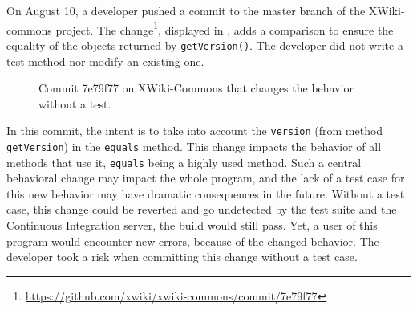 On August 10, a developer pushed a commit to the master branch of the XWiki-commons project. 
The change\footnote{\url{https://github.com/xwiki/xwiki-commons/commit/7e79f77}}, displayed in , adds a comparison to ensure the equality of the objects returned by \texttt{getVersion()}.
The developer did not write a test method nor modify an existing one. 

\begin{figure}[h]
\centering
{}
\caption{Commit 7e79f77 on XWiki-Commons that changes the behavior without a test.}
\label{fig:motivating_example}
\end{figure}

In this commit, the intent is to take into account the \texttt{version} (from method \texttt{getVersion}) in the \texttt{equals} method.
This change impacts the behavior of all methods that use it, \texttt{equals} being a highly used method.
Such a central behavioral change may impact the whole program, and the lack of a test case for this new behavior may have dramatic consequences in the future.
Without a test case, this change could be reverted and go undetected by the test suite and the Continuous Integration server, \ie the build would still pass.
Yet, a user of this program would encounter new errors, because of the changed behavior.
The developer took a risk when committing this change without a test case.

